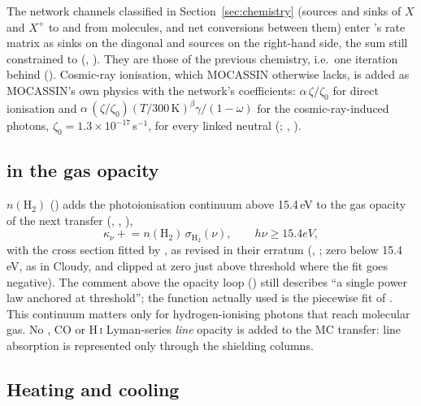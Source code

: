 The network channels classified in Section~\ref{sec:chemistry} (sources and
sinks of $X$ and $X^+$ to and from molecules, and net conversions between
them) enter 's rate matrix as sinks on the diagonal and
sources on the right-hand side, the sum still constrained to 
(, ). They are those of the
previous chemistry, i.e.\ one iteration behind ().
Cosmic-ray ionisation, which MOCASSIN otherwise lacks, is added as MOCASSIN's
own physics with the network's coefficients: $\alpha\,\zeta/\zeta_0$ for direct
ionisation and
$\alpha\,(\zeta/\zeta_0)(T/300\,\mathrm K)^\beta\gamma/(1-\omega)$ for the
cosmic-ray-induced photons, $\zeta_0=1.3\times10^{-17}$\,s$^{-1}$, for every
linked neutral (; , ).

\subsection{\texorpdfstring{\Htwo}{H2} in the gas opacity}

$n(\mathrm{H_2})$ () adds the \Htwo{} photoionisation continuum
above 15.4\,eV to the gas opacity of the next transfer
(, , ),
\begin{equation}
  \kappa_\nu \mathrel{+}= n(\mathrm{H_2})\,\sigma_{\mathrm{H_2}}(\nu),\qquad h\nu\ge15.4\unit{eV},
\end{equation}
with the cross section fitted by \citet{Yan1998}, as revised in their erratum
\citep{Yan2001} (,
; zero below 15.4\,eV, as in Cloudy, and
clipped at zero just above threshold where the fit goes negative). The
comment above the opacity loop () still describes ``a
single power law anchored at threshold''; the function actually used is the
piecewise fit of \citet{Yan1998}. This continuum matters only for
hydrogen-ionising photons that reach molecular gas. No \Htwo{}, CO or
H\,\textsc{i} Lyman-series \emph{line} opacity is added to the MC transfer:
line absorption is represented only through the shielding columns.

\subsection{Heating and cooling}
\label{sec:thermal}

